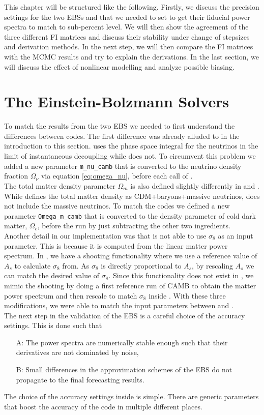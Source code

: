\documentclass[../main.tex]{subfiles}
\begin{document}
This chapter will be structured like the following. Firstly, we discuss the precision settings for the two EBSs \camb and \class that we needed to set to get their fiducial power spectra to match to sub-percent level. We will then show the agreement of the three different FI matrices and discuss their stability under change of stepsizes and derivation methods. In the next step, we will then compare the FI matrices with the MCMC results and try to explain the derivations. In the last section, we will discuss the effect of nonlinear modelling and analyze possible biasing.
\section{The Einstein-Bolzmann Solvers}
To match the results from the two EBS we needed to first understand the differences between codes. The first difference was already alluded to in the introduction to this section. \camb uses the phase space integral for the neutrinos in the limit of instantaneous decoupling while \class does not. To circumvent this problem we added a new parameter {\tt m\_nu\_camb} that is converted to the neutrino density fraction $\Omega_\nu$ via equation \ref{eq:omega_nu}, before each call of \class .\\
The total matter density parameter $\Omega_m$ is also defined slightly differently in \camb and \class. While \camb defines the total matter density as CDM+baryons+massive neutrinos, \class does not include the massive neutrinos. To match the codes we defined a new parameter {\tt Omega\_m\_camb} that is converted to the density parameter of cold dark matter, $\Omega_{c}$, before the run by just subtracting the other two ingredients.\\
Another detail in our implementation was that \camb is not able to use $\sigma_8$ as an input parameter. This is because it is computed from the linear matter power spectrum. In \class, we have a shooting functionality where we use a reference value of $A_s$ to calculate $\sigma_8$ from. As $\sigma_8$ is directly proportional to $A_s$, by rescaling $A_s$ we can match the desired value of $\sigma_8$. Since this functionality does not exist in \camb, we mimic the shooting by doing a first reference run of CAMB to obtain the matter power spectrum and then rescale to match $\sigma_8$ inside \cosmicfish. With these three modifications, we were able to match the input parameters between \class and \camb.\\
The next step in the validation of the EBS is a careful choice of the accuracy settings. This is done such that \begin{enumerate}
    \item[A:] The power spectra are numerically stable enough such that their derivatives are not dominated by noise,
    \item[B:] Small differences in the approximation schemes of the EBS do not propagate to the final forecasting results.   
\end{enumerate} The choice of the accuracy settings inside \camb is simple. There are generic parameters that boost the accuracy of the \camb code in multiple different places.
\end{document}
